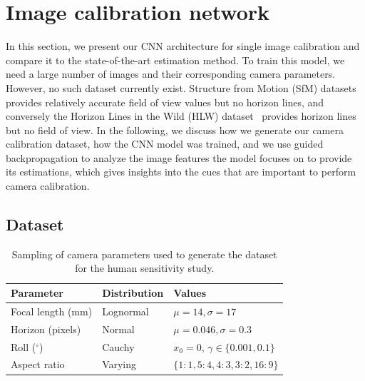 \section{Image calibration network}
\label{sec:ch4_proposed_method}

In this section, we present our CNN architecture for single image calibration  and compare it to the state-of-the-art estimation method.  To train this model, we need a large number of images and their corresponding camera parameters. However, no such dataset currently exist. Structure from Motion (SfM) datasets~\cite{Wilson2014} provides relatively accurate field of view values but no horizon lines, and conversely the Horizon Lines in the Wild (HLW) dataset~\cite{Workman2016} provides horizon lines but no field of view. In the following, we discuss how we generate our camera calibration dataset, how the CNN model was trained, and we use guided backpropagation to analyze the image features the model focuses on to provide its estimations, which gives insights into the cues that are important to perform camera calibration.

\subsection{Dataset}
\label{sec:dataset_generation}

\begin{table}[!t]
\centering
\footnotesize
\begin{tabular}{lll}
\toprule
Parameter & Distribution & Values \\
\midrule
Focal length (mm) & Lognormal & $\mu=14, \sigma=17$ \\
Horizon (pixels) & Normal & $\mu=0.046, \sigma=0.3$ \\
Roll ($^\circ$) & Cauchy & $x_0 = 0$, $\gamma \in \{0.001, 0.1\}$ \\
Aspect ratio & Varying & $\{1{:}1, 5{:}4, 4{:}3, 3{:}2, 16{:}9\}$ \\
\bottomrule
\end{tabular}
\vspace{1em}
\label{tab:parameters-sampling}
\caption{Sampling of camera parameters used to generate the dataset for the human sensitivity study. }
\end{table}

